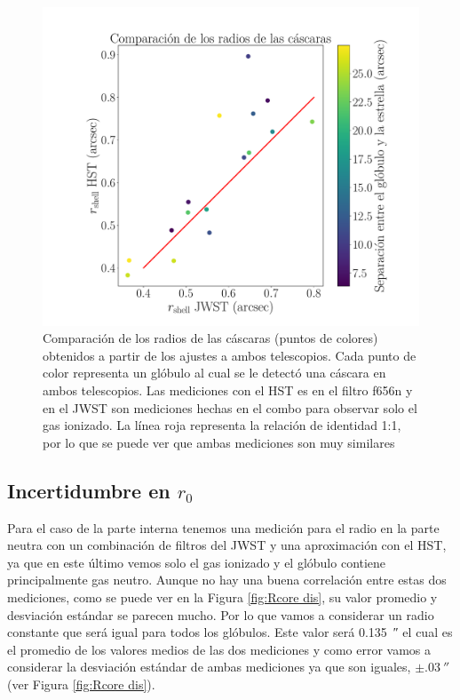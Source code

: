 \documentclass{book}
\begin{document}
\begin{figure}[htb]
    \centering
    \includegraphics[width=\textwidth]{imagenes_corregidas/rshell.pdf}
    \caption{Comparación de los radios de las cáscaras (puntos de colores) obtenidos a partir de los ajustes a ambos telescopios. Cada punto de color representa un glóbulo al cual se le detectó una cáscara en ambos telescopios. Las mediciones con el HST es en el filtro f656n y en el JWST son mediciones hechas en el combo para observar solo el gas ionizado. La línea roja representa la relación de identidad 1:1, por lo que se puede ver que ambas mediciones son muy similares}
    \label{fgi: Radios de la cascara}
\end{figure}

\subsection{\boldmath Incertidumbre en $r_0$}

Para el caso de la parte interna tenemos una medición para el radio en la parte neutra con un combinación de filtros del JWST y una aproximación con el HST, ya que en este último vemos solo el gas ionizado y el glóbulo contiene principalmente gas neutro. Aunque no hay una buena correlación entre estas dos mediciones, como se puede ver en la Figura \ref{fig:Rcore dis}, su valor promedio y desviación estándar se parecen mucho. Por lo que vamos a considerar un radio constante que será igual para todos los glóbulos. Este valor será \SI{0.135}{\arcsecond} el cual es el promedio de los valores medios de las dos mediciones y como error vamos a considerar la desviación estándar de ambas mediciones ya que son iguales, $\pm\SI{.03}{\arcsecond}$ (ver Figura \ref{fig:Rcore dis}).
\end{document}
